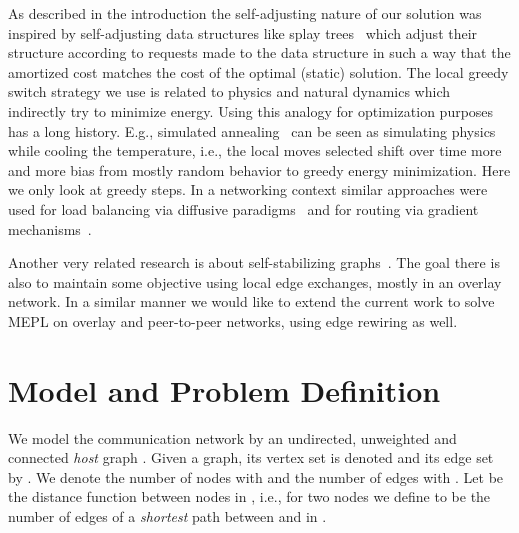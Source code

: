 \documentclass[conference]{IEEEtran}
\begin{document}
As described in the introduction the self-adjusting nature of our solution was inspired by self-adjusting data structures like splay trees~\cite{sleator1985self} which adjust their structure according to requests made to the data structure in such a way that the amortized cost matches the cost of the optimal (static) solution. The local greedy switch strategy we use is related to physics and natural dynamics which indirectly try to minimize energy. Using this analogy for optimization purposes has a long history. E.g., simulated annealing~\cite{kirkpatrick1983optimization} can be seen as simulating physics while cooling the temperature, i.e., the local moves selected shift over time more and more bias from mostly random behavior to greedy energy minimization. Here we only look at greedy steps. 
In a networking context similar approaches were used for load balancing via diffusive paradigms~\cite{rabani1998local} and for routing via gradient mechanisms~\cite{PhysRevE.77.036121}.

Another very related research is about self-stabilizing graphs~\cite{jacob2009distributed,jacob2009self}. The goal there is also to maintain some objective using local edge exchanges,
mostly in an overlay network. In a similar manner we would like to extend the current work to solve MEPL on overlay and peer-to-peer networks, using edge rewiring as well.

























%
 
\section{Model and Problem Definition} \label{sec:model}
We model the communication network by an undirected, unweighted and connected \emph{host} graph . 
Given a graph, its vertex set is denoted  and its edge set by . We denote the number of nodes with  and the number of edges with . Let  be the distance function between nodes in , i.e., for two nodes  we define  to be the number of edges of a \emph{shortest} path between  and  in . 
\end{document}
